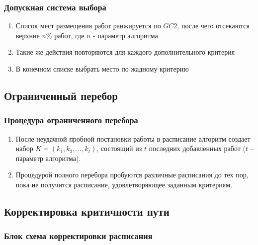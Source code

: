 \documentclass[hyperref=unicode, aspectratio=169]{beamer}
\begin{document}
\begin{frame}
    \frametitle{Допускная система выбора}
    \begin{enumerate}
        \item Список мест размещения работ ранжируется по $GC2$, после чего отсекаются верхние $n\%$ работ, где $n$ - параметр алгоритма
        \item Такие же действия повторяются для каждого дополнительного критерия
        \item В конечном списке выбрать место по жадному критерию
    \end{enumerate}

\end{frame}


\subsection{Ограниченный перебор}
\begin{frame}
    \frametitle{Процедура ограниченного перебора}
    \begin{enumerate}
        \item После неудачной пробной постановки работы в расписание алгоритм создает набор $K=\left( k_1,k_2,\dots,k_t \right)$, состоящий из $t$ последних добавленных работ ($t$ – параметр алгоритма).
        \item Процедурой полного перебора пробуются различные расписания до тех пор, пока не получится расписание, удовлетворяющее заданным критериям.
    \end{enumerate}
\end{frame}

\subsection{Корректировка критичности пути}
\begin{frame}
    \frametitle{Блок схема корректировки расписания}
    {\tiny
    }
\end{frame}
\end{document}
